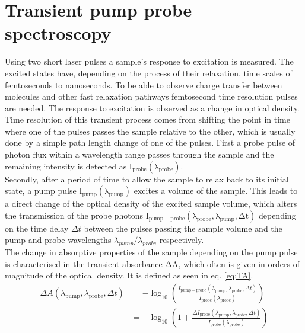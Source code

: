 \documentclass[twoside,openright]{scrreprt}
\begin{document}
\section{Transient pump probe spectroscopy}
Using two short laser pulses a sample's response to excitation is measured. The excited states have, depending on the process of their relaxation, time scales of femtoseconds to nanoseconds. To be able to observe charge transfer between molecules and other fast relaxation pathways femtosecond time resolution pulses are needed. The response to excitation is observed as a change in optical density. Time resolution of this transient process comes from shifting the point in time where one of the pulses passes the sample relative to the other, which is usually done by a simple path length change of one of the pulses.\newline
First a probe pulse of photon flux within a wavelength range passes through the sample and the remaining intensity is detected as $\mathrm{I_{probe}(\lambda_{probe})}$. \\
Secondly, after a period of time to allow the sample to relax back to its initial state, a pump pulse $\mathrm{I_{pump}(\lambda_{pump})}$ excites a volume of the sample. This leads to a direct change of the optical density of the excited sample volume, which alters the transmission of the probe photons $\mathrm{I_{pump-probe}(\lambda_{probe}, \lambda_{pump}, \Delta t)}$ depending on the time delay $\Delta t$ between the pulses passing the sample volume and the pump and probe wavelengths $\lambda_{pump}/\lambda_{probe}$ respectively. \\
The change in absorptive properties of the sample depending on the pump pulse is characterised in the transient absorbance $\mathrm{\Delta A}$, which often is given in orders of magnitude of the optical density. It is defined as seen in eq. \ref{eq:TA}.
\begin{equation}\label{eq:TA}
\begin{split}
\Delta A(\lambda_{\mathrm{pump}}, \lambda_{\mathrm{probe}}, \Delta t)&=-\log _{10}\left(\frac{I_{\mathrm{pump}-\mathrm{probe}}\left(\lambda_{\mathrm{pump}}, \lambda_{\mathrm{probe}}, \Delta t\right)}{I_{\mathrm{probe}}\left(\lambda_{\mathrm{probe}}\right)}\right)\\
&=-\log _{10}\left(1+\frac{\Delta I_{\mathrm{probe}}\left(\lambda_{\mathrm{pump}}, \lambda_{\mathrm{probe}}, \Delta t\right)}{I_{\mathrm{probe}}\left(\lambda_{\mathrm{probe}}\right)}\right)
\end{split}
\end{equation}
\end{document}
